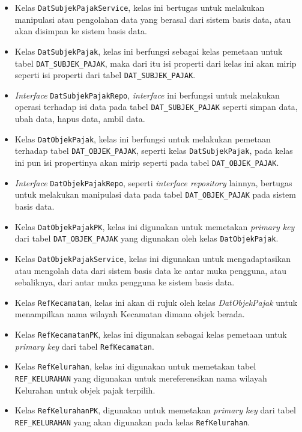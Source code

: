 \documentclass[pdftex,12pt, oneside]{article}
\begin{document}
\begin{itemize}
	\item Kelas \texttt{DatSubjekPajakService}, kelas ini bertugas untuk melakukan manipulasi atau pengolahan data yang berasal dari sistem basis data, atau akan disimpan ke sistem basis data.
	\item Kelas \texttt{DatSubjekPajak}, kelas ini berfungsi sebagai kelas pemetaan untuk tabel \texttt{DAT\_SUBJEK\_PAJAK}, maka dari itu isi properti dari kelas ini akan mirip seperti isi properti dari tabel \texttt{DAT\_SUBJEK\_PAJAK}.
	\item \textit{Interface} \texttt{DatSubjekPajakRepo}, \textit{interface} ini berfungsi untuk melakukan operasi terhadap isi data pada tabel \texttt{DAT\_SUBJEK\_PAJAK} seperti simpan data, ubah data, hapus data, ambil data.
	\item Kelas \texttt{DatObjekPajak}, kelas ini berfungsi untuk melakukan pemetaan terhadap tabel \texttt{DAT\_OBJEK\_PAJAK}, seperti kelas \texttt{DatSubjekPajak}, pada kelas ini pun isi propertinya akan mirip seperti pada tabel \texttt{DAT\_OBJEK\_PAJAK}.
	\item \textit{Interface} \texttt{DatObjekPajakRepo}, seperti \textit{interface repository} lainnya, bertugas untuk melakukan manipulasi data pada tabel \texttt{DAT\_OBJEK\_PAJAK} pada sistem basis data.
	\item Kelas \texttt{DatObjekPajakPK}, kelas ini digunakan untuk memetakan \textit{primary key} dari tabel \texttt{DAT\_OBJEK\_PAJAK} yang digunakan oleh kelas \texttt{DatObjekPajak}.
	\item Kelas \texttt{DatObjekPajakService}, kelas ini digunakan untuk mengadaptasikan atau mengolah data dari sistem basis data ke antar muka pengguna, atau sebaliknya, dari antar muka pengguna ke sistem basis data.
	\item Kelas \texttt{RefKecamatan}, kelas ini akan di rujuk oleh kelas \textit{DatObjekPajak} untuk menampilkan nama wilayah Kecamatan dimana objek berada.
	\item Kelas \texttt{RefKecamatanPK}, kelas ini digunakan sebagai kelas pemetaan untuk \textit{primary key} dari tabel \texttt{RefKecamatan}.
	\item Kelas \texttt{RefKelurahan}, kelas ini digunakan untuk memetakan tabel \texttt{REF\_KELURAHAN} yang digunakan untuk mereferensikan nama wilayah Kelurahan untuk objek pajak terpilih.
	\item Kelas \texttt{RefKelurahanPK}, digunakan untuk memetakan \textit{primary key} dari tabel \texttt{REF\_KELURAHAN} yang akan digunakan pada kelas \texttt{RefKelurahan}.
\end{itemize}
\end{document}

